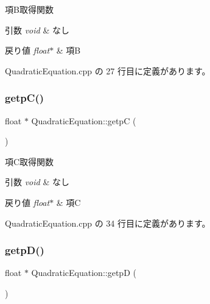 項\+B取得関数 


\begin{DoxyParams}{引数}
{\em void} & なし \\
\hline
\end{DoxyParams}

\begin{DoxyRetVals}{戻り値}
{\em float$\ast$} & 項B \\
\hline
\end{DoxyRetVals}


 Quadratic\+Equation.\+cpp の 27 行目に定義があります。

\mbox{\label{class_quadratic_equation_a35f690714e6a43da0e328ca36f1cd2e3}} 
\subsubsection{\texorpdfstring{getp\+C()}{getpC()}}
{\footnotesize\ttfamily float $\ast$ Quadratic\+Equation\+::getpC (\begin{DoxyParamCaption}{ }\end{DoxyParamCaption})}



項\+C取得関数 


\begin{DoxyParams}{引数}
{\em void} & なし \\
\hline
\end{DoxyParams}

\begin{DoxyRetVals}{戻り値}
{\em float$\ast$} & 項C \\
\hline
\end{DoxyRetVals}


 Quadratic\+Equation.\+cpp の 34 行目に定義があります。

\mbox{\label{class_quadratic_equation_a65188cf2bba1a681e4c8d0e403675413}} 
\subsubsection{\texorpdfstring{getp\+D()}{getpD()}}
{\footnotesize\ttfamily float $\ast$ Quadratic\+Equation\+::getpD (\begin{DoxyParamCaption}{ }\end{DoxyParamCaption})}



